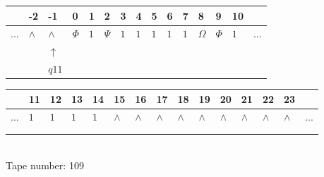 \documentclass[11pt]{article}
\begin{document}
\begin{table}[H]
\centering
\begin{tabular}{lllllllllllllll}
 & -2 & -1 & 0 & 1 & 2 & 3 & 4 & 5 & 6 & 7 & 8 & 9 & 10 & \\
\hline
$...$ & \multicolumn{1}{|l|}{$\wedge$} & \multicolumn{1}{|l|}{$\wedge$} & \multicolumn{1}{|l|}{$\Phi$} & \multicolumn{1}{|l|}{$1$} & \multicolumn{1}{|l|}{$\Psi$} & \multicolumn{1}{|l|}{$1$} & \multicolumn{1}{|l|}{$1$} & \multicolumn{1}{|l|}{$1$} & \multicolumn{1}{|l|}{$1$} & \multicolumn{1}{|l|}{$1$} & \multicolumn{1}{|l|}{$\Omega$} & \multicolumn{1}{|l|}{$\Phi$} & \multicolumn{1}{|l|}{$1$} & $...$\\
\hline
&  & $\uparrow$ &  &  &  &  &  &  &  &  &  &  &  &  \\
&  & $ q11 $ &  &  &  &  &  &  &  &  &  &  &  &  \\
\end{tabular}
\begin{tabular}{lllllllllllllll}
 & 11 & 12 & 13 & 14 & 15 & 16 & 17 & 18 & 19 & 20 & 21 & 22 & 23 & \\
\hline
$...$ & \multicolumn{1}{|l|}{$1$} & \multicolumn{1}{|l|}{$1$} & \multicolumn{1}{|l|}{$1$} & \multicolumn{1}{|l|}{$1$} & \multicolumn{1}{|l|}{$\wedge$} & \multicolumn{1}{|l|}{$\wedge$} & \multicolumn{1}{|l|}{$\wedge$} & \multicolumn{1}{|l|}{$\wedge$} & \multicolumn{1}{|l|}{$\wedge$} & \multicolumn{1}{|l|}{$\wedge$} & \multicolumn{1}{|l|}{$\wedge$} & \multicolumn{1}{|l|}{$\wedge$} & \multicolumn{1}{|l|}{$\wedge$} & $...$\\
\hline
&  &  &  &  &  &  &  &  &  &  &  &  &  &  \\
&  &  &  &  &  &  &  &  &  &  &  &  &  &  \\
\end{tabular}
\\
Tape number: 109
\noindent\makebox[\linewidth]{\hdashrule{\textwidth}{1pt}{1pt}}\end{table}
\end{document}

